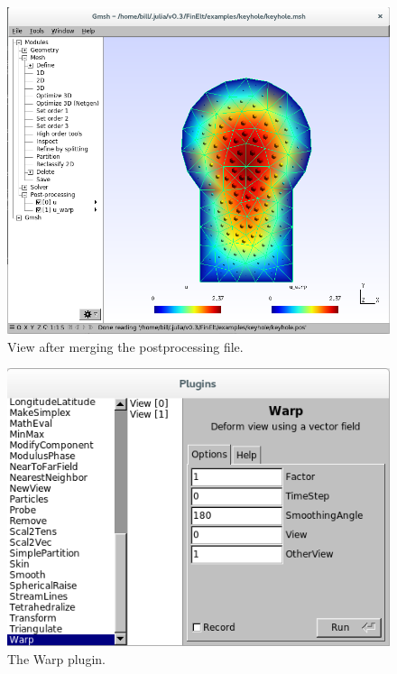 \documentclass[a4paper,12pt]{article}
\begin{document}
\begin{figure}
\caption{View after merging the postprocessing file.}
\label{fig: postprocess}
\begin{center}
\includegraphics[scale=0.4]{images/postprocess.png}
\end{center}
\end{figure}

\begin{figure}
\caption{The Warp plugin.}
\label{fig: Warp}
\begin{center}
\includegraphics[scale=0.4]{images/warp.png}
\end{center}
\end{figure}
\end{document}
